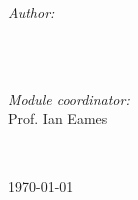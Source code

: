 \begin{titlepage}
  \begin{minipage}{0.4\textwidth}
    \begin{flushleft} \large
      \emph{Author:}\\
      \@author %
      \\[1.2em]
    \end{flushleft}
  \end{minipage}
  ~
  \begin{minipage}{0.4\textwidth}
    \begin{flushright} \large
      \emph{Module coordinator:} \\
      Prof. Ian Eames \\[1.2em] %
    \end{flushright}
  \end{minipage}\\[2cm]
  \makeatother



  {\large \today}\\[2cm] %

  \vfill %

\end{titlepage}